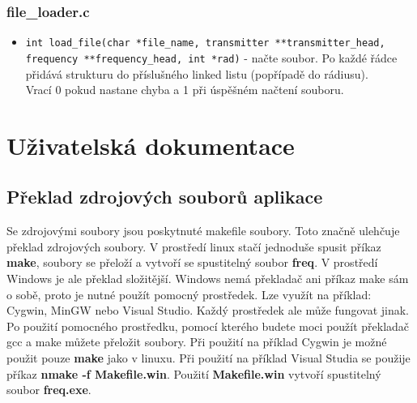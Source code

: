 \documentclass[12pt]{article}
\begin{document}
\subsubsection{file\_loader.c}
%
\begin{itemize}
	\item \texttt{int load\_file(char *file\_name,
		transmitter **transmitter\_head,
              frequency **frequency\_head, int *rad)} - načte soubor. Po každé
		řádce přidává strukturu do příslušného linked listu (popřípadě
		do rádiusu).\\

		Vrací 0 pokud nastane chyba a 1 při úspěšném načtení souboru.
\end{itemize}
%
%

\section{Uživatelská dokumentace}
%
\subsection{Překlad zdrojových souborů aplikace}
Se zdrojovými soubory jsou poskytnuté makefile soubory. Toto značně ulehčuje
překlad zdrojových soubory. V prostředí linux stačí jednoduše spusit příkaz
\textbf{make}, soubory se přeloží a vytvoří se spustitelný soubor \textbf{freq}.
V prostředí Windows je ale překlad složitější. Windows nemá překladač ani 
příkaz make sám o sobě, proto je nutné použít pomocný prostředek. Lze využít 
na příklad: Cygwin, MinGW nebo Visual Studio. Každý prostředek ale může 
fungovat jinak. Po použití pomocného prostředku, pomocí kterého budete moci 
použít překladač gcc a make můžete přeložit soubory. Při použití na příklad 
Cygwin je možné použit pouze \textbf{make} jako v linuxu. Při použití na příklad 
Visual Studia se použije příkaz \textbf{nmake -f Makefile.win}. Použití
\textbf{Makefile.win} vytvoří spustitelný soubor \textbf{freq.exe}.
%
\end{document}
